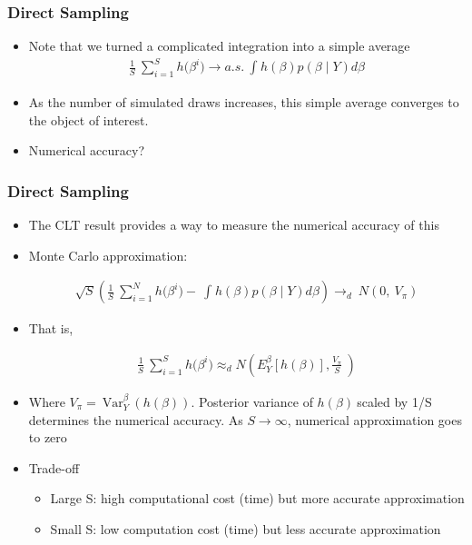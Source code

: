 \documentclass[
  shownotes,
  xcolor={svgnames},
  hyperref={colorlinks,citecolor=DarkBlue,linkcolor=DarkRed,urlcolor=DarkBlue}
  , aspectratio=169]{beamer}
\begin{document}
\begin{frame}[fragile]
\frametitle{Direct Sampling}


\begin{itemize}


\item Note that we turned a complicated integration into a simple average
\medskip
\begin{align}
\frac{1}{S}\ \sum_{i = 1}^{S}{h(\beta^{i}}) \rightarrow a.s.\ \int_{}^{}{h\left( \beta \right)p\left( \beta \middle| Y \right)d\beta}
\end{align}
\medskip
\item As the number of simulated draws increases, this simple average converges to the object of interest.
\medskip
\item Numerical accuracy?
\end{itemize}
\end{frame}
\begin{frame}[fragile]
\frametitle{Direct Sampling}

\begin{itemize}

\item The CLT result provides a way to measure the numerical accuracy of this
\medskip
\item Monte Carlo approximation:

\begin{align}
\sqrt{S}\left( \frac{1}{S}\ \sum_{i = 1}^{N}{h(\beta^{i}}) - \ \int_{}^{}{h\left( \beta \right)p\left( \beta \middle| Y \right)d\beta} \right) \rightarrow_{d}\ N(0,\ V_{\pi})
\end{align}


\item That is,

\begin{align}
\frac{1}{S}\ \sum_{i = 1}^{S}{h(\beta^{i}}) \approx_{d}N\left( E_{Y}^{\beta}\left\lbrack h\left( \beta \right) \right\rbrack,\frac{V_{\pi}}{S}\  \right)
\end{align}


\item Where $V_{\pi} = \ \text{Var}_{Y}^{\beta}\ (h\left( \beta \right))$. Posterior variance of $h\left( \beta \right)\ $scaled by 1/S determines the numerical accuracy. As $S \rightarrow \infty$, numerical approximation goes to zero

    \item Trade-off
    \begin{itemize}
        \item Large S: high computational cost (time) but more accurate approximation

        \item Small S: low computation cost (time) but less accurate approximation
    \end{itemize}
\end{itemize}
\end{frame}
\end{document}

